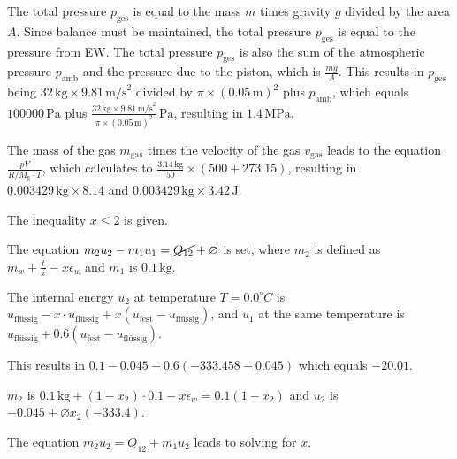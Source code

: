 The total pressure \( p_{\text{ges}} \) is equal to the mass \( m \) times gravity \( g \) divided by the area \( A \). Since balance must be maintained, the total pressure \( p_{\text{ges}} \) is equal to the pressure from EW. The total pressure \( p_{\text{ges}} \) is also the sum of the atmospheric pressure \( p_{\text{amb}} \) and the pressure due to the piston, which is \( \frac{mg}{A} \). This results in \( p_{\text{ges}} \) being \( 32 \, \text{kg} \times 9.81 \, \text{m/s}^2 \) divided by \( \pi \times (0.05 \, \text{m})^2 \) plus \( p_{\text{amb}} \), which equals \( 100000 \, \text{Pa} \) plus \( \frac{32 \, \text{kg} \times 9.81 \, \text{m/s}^2}{\pi \times (0.05 \, \text{m})^2} \, \text{Pa} \), resulting in \( 1.4 \, \text{MPa} \).

The mass of the gas \( m_{\text{gas}} \) times the velocity of the gas \( v_{\text{gas}} \) leads to the equation \( \frac{pV}{R/M_{\text{g}} \cdot T} \), which calculates to \( \frac{3.14 \, \text{kg}}{50} \times (500 + 273.15) \), resulting in \( 0.003429 \, \text{kg} \times 8.14 \) and \( 0.003429 \, \text{kg} \times 3.42 \, \text{J} \).

The inequality \( x \leq 2 \) is given.

The equation \( m_2 u_2 - m_1 u_1 = \cancel{Q_{12}} + \varnothing \) is set, where \( m_2 \) is defined as \( m_w + \frac{t}{x} - x \epsilon_w \) and \( m_1 \) is \( 0.1 \, \text{kg} \).

The internal energy \( u_2 \) at temperature \( T = 0.0^\circ C \) is \( u_{\text{flüssig}} - x \cdot u_{\text{flüssig}} + x \left( u_{\text{fest}} - u_{\text{flüssig}} \right) \), and \( u_1 \) at the same temperature is \( u_{\text{flüssig}} + 0.6 \left( u_{\text{fest}} - u_{\text{flüssig}} \right) \).

This results in \( 0.1 - 0.045 + 0.6 \left( -333.458 + 0.045 \right) \) which equals \(-20.01\).

\( m_2 \) is \( 0.1 \, \text{kg} + \left( 1 - x_2 \right) \cdot 0.1 - x \epsilon_w = 0.1 \left( 1 - x_2 \right) \) and \( u_2 \) is \(-0.045 + \varnothing x_2 \left( -333.4 \right) \).

The equation \( m_2 u_2 = Q_{12} + m_1 u_2 \) leads to solving for \( x \).